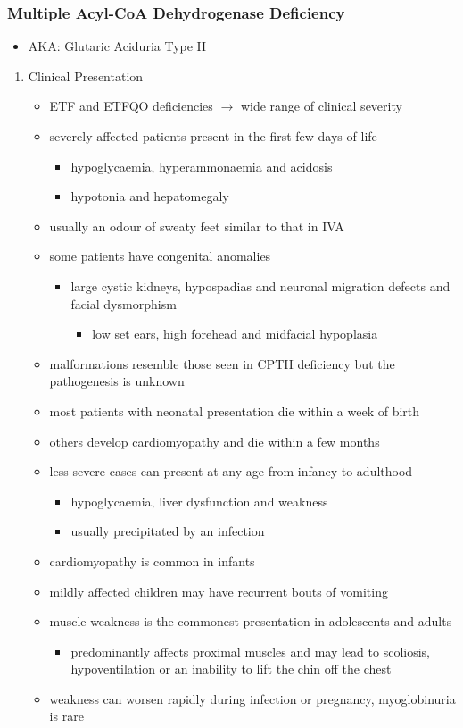 \documentclass{scrartcl}
\begin{document}
\subsubsection{Multiple Acyl-CoA Dehydrogenase Deficiency}
\label{sec:orgb9c10f4}
\begin{itemize}
\item AKA: Glutaric Aciduria Type II
\end{itemize}
\begin{enumerate}
\item Clinical Presentation
\label{sec:org6da496c}
\begin{itemize}
\item ETF and ETFQO deficiencies \(\to\) wide range of clinical severity
\item severely affected patients present in the first few days of life
\begin{itemize}
\item hypoglycaemia, hyperammonaemia and acidosis
\item hypotonia and hepatomegaly
\end{itemize}
\item usually an odour of sweaty feet similar to that in IVA
\item some patients have congenital anomalies
\begin{itemize}
\item large cystic kidneys, hypospadias and neuronal migration defects and facial dysmorphism
\begin{itemize}
\item low set ears, high forehead and midfacial hypoplasia
\end{itemize}
\end{itemize}
\item malformations resemble those seen in CPTII deficiency but the pathogenesis is unknown
\item most patients with neonatal presentation die within a week of birth
\item others develop cardiomyopathy and die within a few months
\item less severe cases can present at any age from infancy to adulthood
\begin{itemize}
\item hypoglycaemia, liver dysfunction and weakness
\item usually precipitated by an infection
\end{itemize}
\item cardiomyopathy is common in infants
\item mildly affected children may have recurrent bouts of vomiting
\item muscle weakness is the commonest presentation in adolescents and adults
\begin{itemize}
\item predominantly affects proximal muscles and may lead to scoliosis,
hypoventilation or an inability to lift the chin off the chest
\end{itemize}
\item weakness can worsen rapidly during infection or pregnancy, myoglobinuria is rare
\end{itemize}


\end{enumerate}
\end{document}
